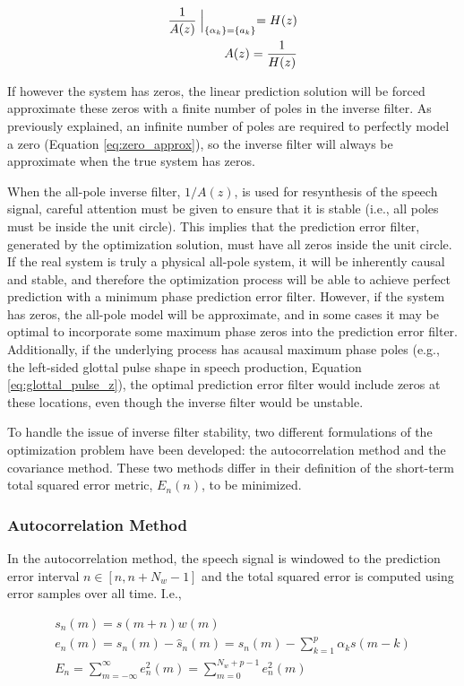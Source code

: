 \begin{eqnarray}
	\frac{1}{A(z)}\Bigm|_{\{\alpha_k\}=\{a_k\}}=H(z) \\
	A(z)=\frac{1}{H(z)}
\end{eqnarray}

If however the system has zeros, the linear prediction solution will be forced approximate these zeros with a finite number of poles in the inverse filter. As previously explained, an infinite number of poles are required to perfectly model a zero (Equation \ref{eq:zero_approx}), so the inverse filter will always be approximate when the true system has zeros.

When the all-pole inverse filter, $1/A(z)$,  is used for resynthesis of the speech signal, careful attention must be given to ensure that it is stable (i.e., all poles must be inside the unit circle). This implies that the prediction error filter, generated by the optimization solution, must have all zeros inside the unit circle. If the real system is truly a physical all-pole system, it will be inherently causal and stable, and therefore the optimization process will be able to achieve perfect prediction with a minimum phase prediction error filter. However, if the system has zeros, the all-pole model will be approximate, and in some cases it may be optimal to incorporate some maximum phase zeros into the prediction error filter. Additionally, if the underlying process has acausal maximum phase poles (e.g., the left-sided glottal pulse shape in speech production, Equation \ref{eq:glottal_pulse_z}), the optimal prediction error filter would include zeros at these locations, even though the inverse filter would be unstable.

To handle the issue of inverse filter stability, two different formulations of the optimization problem have been developed: the autocorrelation method and the covariance method. These two methods differ in their definition of the short-term total squared error metric, $E_n(n)$, to be minimized. 


\subsubsection{Autocorrelation Method}

In the autocorrelation method, the speech signal is windowed to the prediction error interval $n \in [n, n+N_w-1]$ and the total squared error is computed using error samples over all time. I.e.,

\begin{eqnarray}
	s_n(m) = s(m+n)w(m) \\
	e_n(m) = s_n(m) - \hat{s}_n(m) = s_n(m) - \sum_{k=1}^{p} \alpha_k s(m-k) \\
	E_n = \sum_{m=-\infty}^{\infty}e_n^2(m) = \sum_{m=0}^{N_w+p-1}e_n^2(m) \label{eq:autocorr_tse}
\end{eqnarray}

